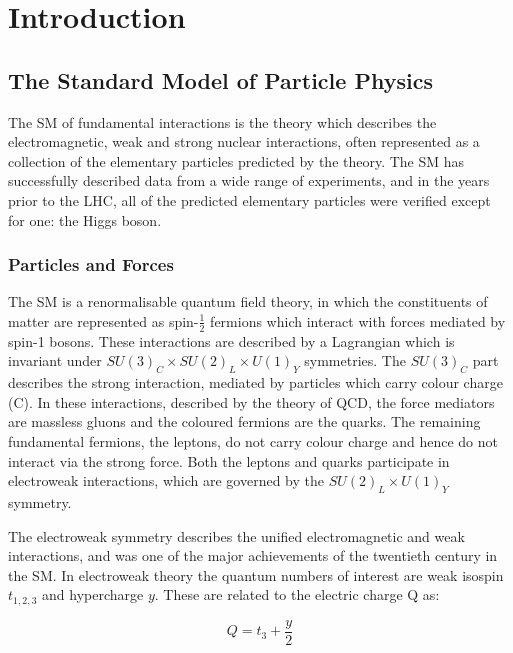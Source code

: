 \chapter{Introduction}
\label{chap:theory}

\section{The Standard Model of Particle Physics}
\label{sec:theSM}

The \ac{SM} of fundamental interactions is the theory
which describes the electromagnetic, weak and strong nuclear interactions, often
represented as a collection of the elementary particles predicted by the theory.
The SM has successfully described data from a wide range of experiments, and in the 
years prior to the LHC, all of the predicted elementary particles were verified 
except for one: the Higgs boson.

\subsection{Particles and Forces} 

The \ac{SM} is a renormalisable quantum field theory, in which the constituents of
matter are represented as spin-$\frac{1}{2}$ fermions which interact with
forces mediated by spin-1 bosons. These interactions are described by a
Lagrangian which is invariant under $SU(3)_{C} \times SU(2)_{L} \times U(1)_{Y}$
symmetries. The $SU(3)_{C}$ part describes the strong interaction, mediated by
particles which carry colour charge (C). In these interactions, described by the
theory of \ac{QCD}\cite{}, the force mediators are massless gluons
and the coloured fermions are the quarks. The remaining fundamental fermions,
the leptons, do not carry colour charge and hence do not interact via the strong
force. Both the leptons and quarks participate in electroweak interactions,
which are governed by the $SU(2)_{L} \times U(1)_{Y}$ symmetry.

The electroweak symmetry describes the unified electromagnetic and weak
interactions\cite{}, and was one of the major achievements of the twentieth
century in the \ac{SM}. In electroweak theory the quantum numbers of interest are
weak isospin $t_{1,2,3}$ and hypercharge $y$. These are related to the
electric charge Q as: 

\begin{equation}
Q = t_{3} + \frac{y}{2}
\end{equation}

